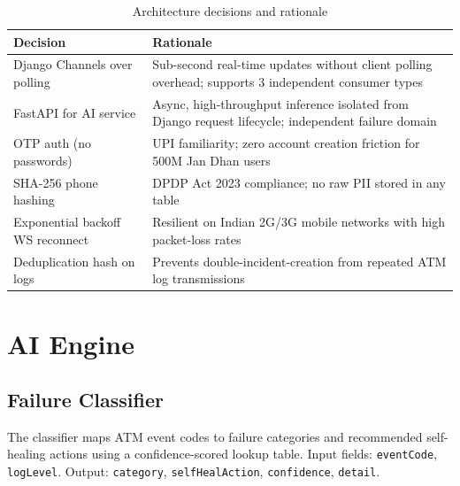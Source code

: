 \documentclass[11pt,a4paper]{article}
\begin{document}
\begin{table}[H]
\centering
\small
\caption{Architecture decisions and rationale}
\label{tab:decisions}
\begin{tabularx}{\linewidth}{@{}lX@{}}
\toprule
\textbf{Decision} & \textbf{Rationale} \\
\midrule
Django Channels over polling & Sub-second real-time updates without client polling overhead; supports 3 independent consumer types \\
FastAPI for AI service & Async, high-throughput inference isolated from Django request lifecycle; independent failure domain \\
OTP auth (no passwords) & UPI familiarity; zero account creation friction for 500M Jan Dhan users \\
SHA-256 phone hashing & DPDP Act 2023 compliance; no raw PII stored in any table \\
Exponential backoff WS reconnect & Resilient on Indian 2G/3G mobile networks with high packet-loss rates \\
Deduplication hash on logs & Prevents double-incident-creation from repeated ATM log transmissions \\
\bottomrule
\end{tabularx}
\end{table}

\section{AI Engine}

\subsection{Failure Classifier}

The classifier maps ATM event codes to failure categories and recommended self-healing actions using a confidence-scored lookup table. Input fields: \texttt{eventCode}, \texttt{logLevel}. Output: \texttt{category}, \texttt{selfHealAction}, \texttt{confidence}, \texttt{detail}.
\end{document}
